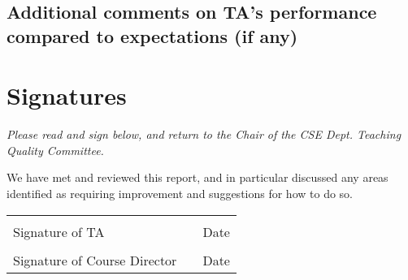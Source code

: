 \subsection*{Additional comments on TA's performance compared to expectations
(if any)\vfill}


\parbox[b]{\textwidth}{
\section{Signatures}

\textit{Please read and sign below, and return to the Chair of the CSE Dept.
Teaching Quality Committee.}

We have met and reviewed this report, and in particular discussed any areas
identified as requiring improvement and suggestions for how to do so.

\begin{tabular}{m{3in}m{0.5in}m{2in}}
& & \\[1in]\cmidrule(l){1-1}\cmidrule(l){3-3}
Signature of TA & & Date \\
& & \\[1in]\cmidrule(l){1-1}\cmidrule(l){3-3}
Signature of Course Director & & Date \\
\end{tabular}
}

\label{LastPage}

